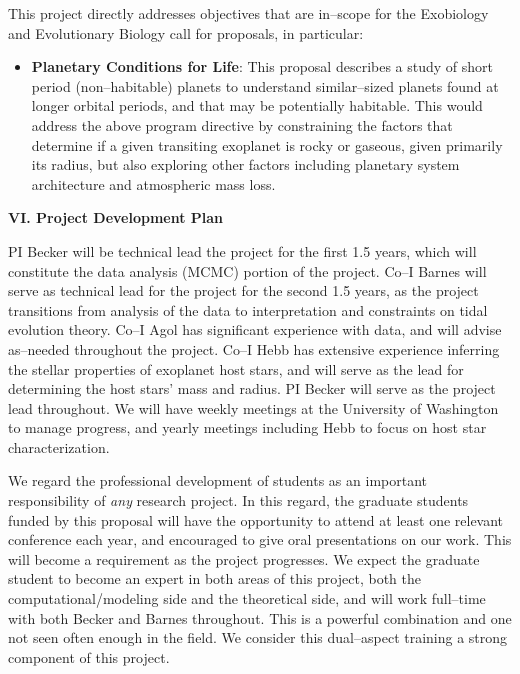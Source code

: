 This project directly addresses objectives that are in--scope for the
Exobiology and Evolutionary Biology call for proposals, in particular:
\begin{itemize}

\item {\bf Planetary Conditions for Life}: 
This proposal describes a study of short period (non--habitable)
planets to understand similar--sized planets found at longer orbital
periods, and that may be potentially habitable.  This would address
the above program directive by constraining the factors that determine
if a given transiting exoplanet is rocky or gaseous, given primarily
its radius, but also exploring other factors including planetary
system architecture and atmospheric mass loss.

\end{itemize}

\bigskip
\centerline{\bf VI. Project Development Plan}
\smallskip

PI Becker will be technical lead the project for the first 1.5 years,
which will constitute the data analysis (MCMC) portion of the project.
Co--I Barnes will serve as technical lead for the project for the
second 1.5 years, as the project transitions from analysis of the data
to interpretation and constraints on tidal evolution theory.  Co--I
Agol has significant experience with \kepler data, and will advise
as--needed throughout the project.  Co--I Hebb has extensive
experience inferring the stellar properties of exoplanet host stars,
and will serve as the lead for determining the host stars' mass and
radius.  PI Becker will serve as the project lead throughout.  We will
have weekly meetings at the University of Washington to manage
progress, and yearly meetings including Hebb to focus on host star
characterization.

We regard the professional development of students as an important
responsibility of {\it any} research project.  In this regard, the
graduate students funded by this proposal will have the opportunity to
attend at least one relevant conference each year, and encouraged to
give oral presentations on our work.  This will become a requirement
as the project progresses.  We expect the graduate student to become
an expert in both areas of this project, both the
computational/modeling side and the theoretical side, and will work
full--time with both Becker and Barnes throughout.  This is a powerful
combination and one not seen often enough in the field.  We consider
this dual--aspect training a strong component of this project.

